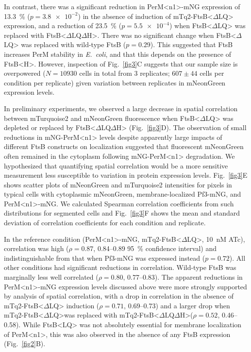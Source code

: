 \documentclass[twocolumn,pdflatex,sn-nature]{sn-jnl}%
\def\textsuperscript#1{<#1>}%
\newcommand\ec{\textit{E.~coli}}
\newcommand\ftsbLQ{FtsB\textsuperscript{LQ}}
\newcommand\ftsbH{FtsB\textsuperscript{H}}
\newcommand\ftsbdLQ{FtsB\textsuperscript{$\Delta{}$LQ}}
\newcommand\ftsbdLQdH{FtsB\textsuperscript{$\Delta{}$LQ$\Delta{}$H}}
\newcommand\permN{PerM\textsuperscript{n1}}
\begin{document}
In contrast, there was a significant reduction in \permN{}-mNG expression of \qty{13.3}{\percent} ($p=\num{3.8e-2}$) in the absence of induction of mTq2-\ftsbdLQ{} expression, and a reduction of \qty{23.5}{\percent} ($p=\num{5.5e-4}$) when \ftsbdLQ{} was replaced with \ftsbdLQdH{}.
There was no significant change when \ftsbdLQ{} was replaced with wild-type FtsB ($p=0.29$). This suggested that FtsB increases PerM stability in \ec{}, and that this depends on the presence of \ftsbH{}.
However, inspection of Fig.~\ref{fig3}C suggests that our sample size is overpowered ($N=\num{10930}$ cells in total from 3 replicates; $607 \pm 44$ cells per condition per replicate) given variation between replicates in mNeonGreen expression levels. 

In preliminary experiments, we observed a large decrease in spatial correlation between mTurquoise2 and mNeonGreen fluorescence when \ftsbdLQ{} was depleted or replaced by \ftsbdLQdH{} (Fig.~\ref{fig3}D).
The observation of small reductions in mNG-\permN{} levels despite apparently large impacts of different FtsB constructs on localization suggested that fluorescent mNeonGreen often remained in the cytoplasm following mNG-\permN{} degradation.
We hypothesized that quantifying spatial correlation would be a more sensitive measurement less susceptible to variation in protein expression levels.
Fig.~\ref{fig3}E shows scatter plots of mNeonGreen and mTurquoise2 intensities for pixels in typical cells with cytoplasmic mNeonGreen, membrane-localized Pf3-mNG, and \permN{}-mNG.
We calculated Spearman correlation coefficients from such distributions for segmented cells and Fig.~\ref{fig3}F shows the mean and standard deviation of correlation coefficients for each condition and replicate.

In the reference condition (\permN{}-mNG, mTq2-\ftsbdLQ, \qty{10}{nM} ATc), correlation was high ($\rho = 0.87$, 0.84--0.89 \qty{95}{\percent} confidence interval) and indistinguishable from that when Pf3-mNG was expressed instead ($p = 0.72$).
All other conditions had significant reductions in correlation. Wild-type FtsB was marginally less well correlated ($\rho = 0.80$, 0.77--0.83).
The apparent reductions in \permN{}-mNG expression levels discussed above were more strongly supported by analysis of spatial correlation, with a drop in correlation in the absence of mTq2-\ftsbdLQ{} induction ($\rho = 0.71$, 0.69--0.73) and a larger drop when mTq2-\ftsbdLQ was replaced with mTq2-\ftsbdLQdH ($\rho = 0.52$, 0.46--0.58).
While \ftsbLQ{} was not absolutely essential for membrane localization of \permN{}, this was also observed in the absence of any FtsB expression (Fig.~\ref{fig2}B).
\end{document}

